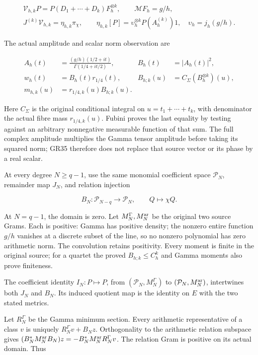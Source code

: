 \documentclass{article}
\begin{document}
\[
\begin{gathered}
\mathcal V_{h,k}P=P(D_1+\cdots+D_k)F_h^{\otimes k},\qquad
\mathcal MF_h=g/h,\\
J^{(k)}\mathcal V_{h,k}=\eta_{h,k}\pi_\chi,\qquad
\eta_{h,k}[P]=\upsilon_h^{\otimes k}P(A_h^{(k)})1,\quad
\upsilon_h=j_h(g/h).
\end{gathered}
\tag{GR34}
\]

The actual amplitude and scalar norm observation are

\[
\begin{aligned}
A_h(t)&=\frac{(g/h)(1/2+it)}{\Gamma(1/4+it/2)},&
B_h(t)&=|A_h(t)|^2,\\
w_h(t)&=B_h(t)r_{1/4}(t),&
B_{h;k}(u)&=C_\Sigma(B_h^{\otimes k})(u),\\
m_{h,k}(u)&=r_{1/4,k}(u)B_{h;k}(u).
\end{aligned}
\tag{GR35}
\]

Here \(C_\Sigma\) is the original conditional integral on \(u=t_1+\cdots+t_k\), with denominator the actual fibre mass \(r_{1/4,k}(u)\). Fubini proves the last equality by testing against an arbitrary nonnegative measurable function of that sum. The full complex amplitude multiplies the Gamma tensor amplitude before taking its squared norm; GR35 therefore does not replace that source vector or its phase by a real scalar.

At every degree \(N\ge q-1\), use the same monomial coefficient space \(\mathcal P_N\), remainder map \(J_N\), and relation injection

\[
B_N:\mathcal P_{N-q}\longrightarrow\mathcal P_N,\qquad Q\longmapsto\chi Q.
\tag{GR36}
\]

At \(N=q-1\), the domain is zero. Let \(M_N^\Gamma,M_N^{\rm ar}\) be the original two source Grams. Each is positive: Gamma has positive density; the nonzero entire function \(g/h\) vanishes at a discrete subset of the line, so no nonzero polynomial has zero arithmetic norm. The convolution retains positivity. Every moment is finite in the original source; for a quartet the proved \(B_{h;k}\le C_h^k\) and Gamma moments also prove finiteness.

The coefficient identity \(I_N:P\mapsto P\), from \((\mathcal P_N,M_N^\Gamma)\) to \((\mathcal P_N,M_N^{\rm ar})\), intertwines both \(J_N\) and \(B_N\). Its induced quotient map is the identity on \(E\) with the two stated metrics.

Let \(R_N^\Gamma\) be the Gamma minimum section. Every arithmetic representative of a class \(v\) is uniquely \(R_N^\Gamma v+B_Nz\). Orthogonality to the arithmetic relation subspace gives \((B_N^*M_N^{\rm ar}B_N)z=-B_N^*M_N^{\rm ar}R_N^\Gamma v\). The relation Gram is positive on its actual domain. Thus
\end{document}
